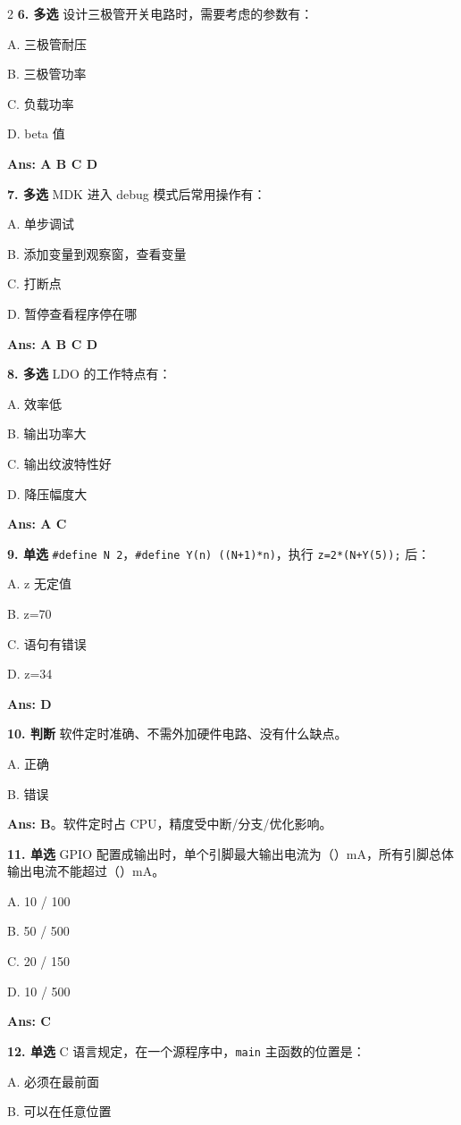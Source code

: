 \documentclass[UTF8,zihao=-5]{ctexart}
\begin{document}
\begin{multicols*}{2}
\textbf{6. 多选} 设计三极管开关电路时，需要考虑的参数有：\par
A. 三极管耐压\par
B. 三极管功率\par
C. 负载功率\par
D. beta 值\par
\textbf{Ans: A B C D}\par
\textbf{7. 多选} MDK 进入 debug 模式后常用操作有：\par
A. 单步调试\par
B. 添加变量到观察窗，查看变量\par
C. 打断点\par
D. 暂停查看程序停在哪\par
\textbf{Ans: A B C D}\par
\textbf{8. 多选} LDO 的工作特点有：\par
A. 效率低\par
B. 输出功率大\par
C. 输出纹波特性好\par
D. 降压幅度大\par
\textbf{Ans: A C}\par
\textbf{9. 单选} \texttt{\#define N 2}，\texttt{\#define Y(n) ((N+1)*n)}，执行 \texttt{z=2*(N+Y(5));} 后：\par
A. z 无定值\par
B. z=70\par
C. 语句有错误\par
D. z=34\par
\textbf{Ans: D}\par
\textbf{10. 判断} 软件定时准确、不需外加硬件电路、没有什么缺点。\par
A. 正确\par
B. 错误\par
\textbf{Ans: B}。软件定时占 CPU，精度受中断/分支/优化影响。\par
\textbf{11. 单选} GPIO 配置成输出时，单个引脚最大输出电流为（）mA，所有引脚总体输出电流不能超过（）mA。\par
A. 10 / 100\par
B. 50 / 500\par
C. 20 / 150\par
D. 10 / 500\par
\textbf{Ans: C}\par
\textbf{12. 单选} C 语言规定，在一个源程序中，\texttt{main} 主函数的位置是：\par
A. 必须在最前面\par
B. 可以在任意位置\par

\end{multicols*}
\end{document}
